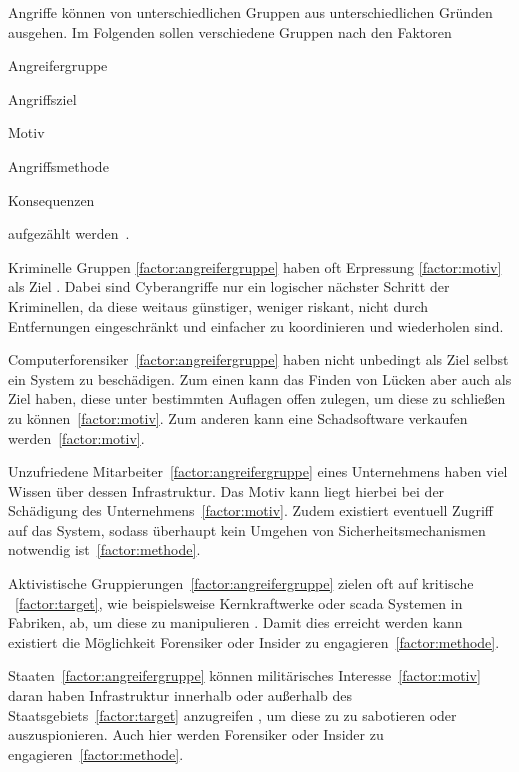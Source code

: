 Angriffe können von unterschiedlichen Gruppen aus unterschiedlichen Gründen ausgehen.
Im Folgenden sollen verschiedene Gruppen nach den Faktoren
\begin{enumerate*}[label=(\alph*),before=\unskip{: }, itemjoin={{; }}, itemjoin*={{, und }}]
    \item Angreifergruppe\label{factor:angreifergruppe}
    \item Angriffsziel\label{factor:target}
    \item Motiv\label{factor:motiv}
    \item Angriffsmethode\label{factor:methode}
    \item Konsequenzen \label{factor:konsequenz}
\end{enumerate*} aufgezählt werden~\cite{HLL+17}.

Kriminelle Gruppen \ref{factor:angreifergruppe} haben oft Erpressung \ref{factor:motiv} als Ziel \cite{WYX+10}.
Dabei sind Cyberangriffe nur ein logischer nächster Schritt der Kriminellen, da diese weitaus günstiger, weniger riskant, nicht durch Entfernungen eingeschränkt und einfacher zu koordinieren und wiederholen sind. \cite{CAS+09}

Computerforensiker~\ref{factor:angreifergruppe} haben nicht unbedingt als Ziel selbst ein System zu beschädigen.
Zum einen kann das Finden von Lücken aber auch als Ziel haben, diese unter bestimmten Auflagen offen zulegen, um diese zu schließen zu können~\ref{factor:motiv}. 
Zum anderen kann eine Schadsoftware verkaufen werden~\ref{factor:motiv}. 

Unzufriedene Mitarbeiter~\ref{factor:angreifergruppe} eines Unternehmens haben viel Wissen über dessen Infrastruktur.
Das Motiv kann liegt hierbei bei der Schädigung des Unternehmens~\ref{factor:motiv}.
Zudem existiert eventuell Zugriff auf das System, sodass überhaupt kein Umgehen von Sicherheitsmechanismen notwendig ist~\ref{factor:methode}.~\cite{CAS+09,WYX+10}

Aktivistische Gruppierungen~\ref{factor:angreifergruppe} zielen oft auf kritische \cps~\ref{factor:target}, wie beispielsweise Kernkraftwerke oder \gls{scada} Systemen in Fabriken, ab, um diese zu manipulieren \cite{CAS+09,HLL+17}. 
Damit dies erreicht werden kann existiert die Möglichkeit Forensiker oder Insider zu engagieren~\ref{factor:methode}.~\cite{WYX+10}

Staaten~\ref{factor:angreifergruppe} können militärisches Interesse~\ref{factor:motiv} daran haben Infrastruktur innerhalb oder außerhalb des Staatsgebiets~\ref{factor:target} anzugreifen \cite{CAS+09}, um diese zu zu sabotieren oder auszuspionieren.
Auch hier werden Forensiker oder Insider zu engagieren~\ref{factor:methode}.

